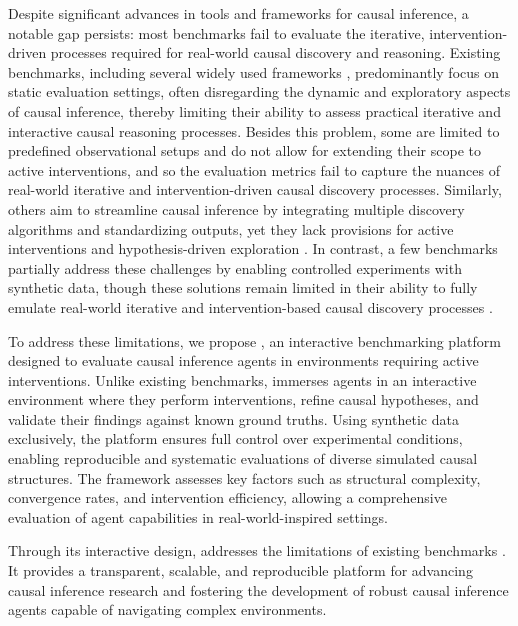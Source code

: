 \documentclass{article}
\begin{document}
    Despite significant advances in tools and frameworks for causal inference, a notable gap persists: most benchmarks fail to evaluate the iterative, intervention-driven processes required for real-world causal discovery and reasoning. 
    Existing benchmarks, including several widely used frameworks \cite{CauseBox2021, ACCBench2024, CIPCaDBench2022}, predominantly focus on static evaluation settings, often disregarding the dynamic and exploratory aspects of causal inference, thereby limiting their ability to assess practical iterative and interactive causal reasoning processes. 
    Besides this problem, some are limited to predefined observational setups and do not allow for extending their scope to active interventions, and so the evaluation metrics fail to capture the nuances of real-world iterative and intervention-driven causal discovery processes. 
    Similarly, others aim to streamline causal inference by integrating multiple discovery algorithms and standardizing outputs, yet they lack provisions for active interventions and hypothesis-driven exploration \cite{ACCBench2024, Framework2021}. 
    In contrast, a few benchmarks partially address these challenges by enabling controlled experiments with synthetic data, though these solutions remain limited in their ability to fully emulate real-world iterative and intervention-based causal discovery processes \cite{runge2019causality, IBM2022}.

    To address these limitations, we propose \game, an interactive benchmarking platform designed to evaluate causal inference agents in environments requiring active interventions. 
    Unlike existing benchmarks, \game immerses agents in an interactive environment where they perform interventions, refine causal hypotheses, and validate their findings against known ground truths.
    Using synthetic data exclusively, the platform ensures full control over experimental conditions, enabling reproducible and systematic evaluations of diverse simulated causal structures. 
    The framework assesses key factors such as structural complexity, convergence rates, and intervention efficiency, allowing a comprehensive evaluation of agent capabilities in real-world-inspired settings.

    Through its interactive design, \game addresses the limitations of existing benchmarks \cite{CausalDiscoveryFramework2024, RealCause2021, BayesianCausalDiscovery2023, CausalBench2024, EvaluationFramework2022, CauseBox2021, PersonalizedExperimentation2022}.
    It provides a transparent, scalable, and reproducible platform for advancing causal inference research and fostering the development of robust causal inference agents capable of navigating complex environments.
\end{document}
